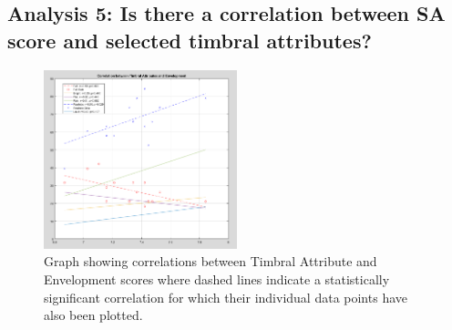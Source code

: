 















\subsection{Analysis 5: Is there a correlation between SA score and selected timbral attributes?}


	\begin{figure}
		\includegraphics[width=0.5\textwidth]{images/plots/sa_ta_corr_env.PNG}
		\caption{Graph showing correlations between Timbral Attribute and Envelopment scores where dashed lines indicate a statistically significant correlation for which their individual data points have also been plotted.}
		\label{image:corr_env} 
	\end{figure}		
